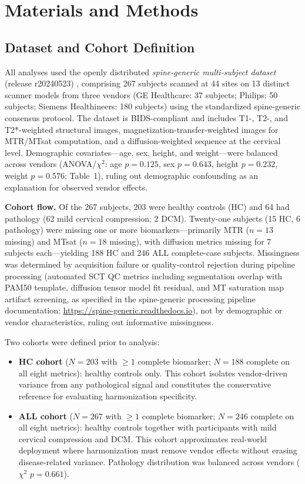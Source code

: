 \documentclass[12pt,a4paper]{article}
\begin{document}
\section{Materials and Methods}

\subsection{Dataset and Cohort Definition}

All analyses used the openly distributed \emph{spine-generic multi-subject dataset} (release r20240523) \cite{cohen2021opena}, comprising 267 subjects scanned at 44 sites on 13 distinct scanner models from three vendors (GE Healthcare: 37 subjects; Philips: 50 subjects; Siemens Healthineers: 180 subjects) using the standardized spine-generic consensus protocol. The dataset is BIDS-compliant and includes T1-, T2-, and T2*-weighted structural images, magnetization-transfer-weighted images for MTR/MTsat computation, and a diffusion-weighted sequence at the cervical level. Demographic covariates---age, sex, height, and weight---were balanced across vendors (ANOVA/$\chi^2$: age $p = 0.125$, sex $p = 0.643$, height $p = 0.232$, weight $p = 0.576$; Table~1), ruling out demographic confounding as an explanation for observed vendor effects.

\textbf{Cohort flow.} Of the 267 subjects, 203 were healthy controls (HC) and 64 had pathology (62 mild cervical compression; 2 DCM). Twenty-one subjects (15 HC, 6 pathology) were missing one or more biomarkers---primarily MTR ($n=13$ missing) and MTsat ($n=18$ missing), with diffusion metrics missing for 7 subjects each---yielding 188 HC and 246 ALL complete-case subjects. Missingness was determined by acquisition failure or quality-control rejection during pipeline processing (automated SCT QC metrics including segmentation overlap with PAM50 template, diffusion tensor model fit residual, and MT saturation map artifact screening, as specified in the spine-generic processing pipeline documentation; \url{https://spine-generic.readthedocs.io}), not by demographic or vendor characteristics, ruling out informative missingness.

Two cohorts were defined prior to analysis:
\begin{itemize}[nosep]
  \item \textbf{HC cohort} ($N=203$ with $\geq 1$ complete biomarker; $N=188$ complete on all eight metrics): healthy controls only. This cohort isolates vendor-driven variance from any pathological signal and constitutes the conservative reference for evaluating harmonization specificity.
  \item \textbf{ALL cohort} ($N=267$ with $\geq 1$ complete biomarker; $N=246$ complete on all eight metrics): healthy controls together with participants with mild cervical compression and DCM. This cohort approximates real-world deployment where harmonization must remove vendor effects without erasing disease-related variance. Pathology distribution was balanced across vendors ($\chi^2$ $p = 0.661$).
\end{itemize}
\end{document}
